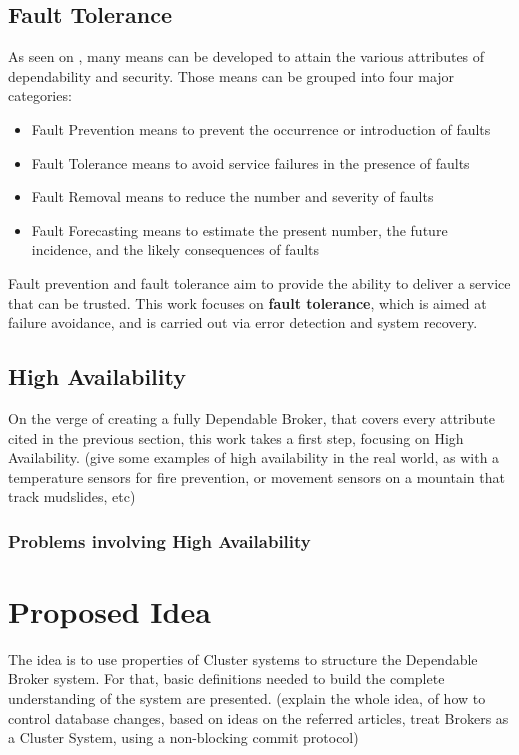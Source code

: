 \subsection{Fault Tolerance}
As seen on \cite{avivzienis2004basic}, many means can be developed to attain the various attributes of
dependability and security. Those means can be grouped into four major categories:
\begin{itemize}
	\item{Fault Prevention} means to prevent the occurrence or introduction of faults
	\item{Fault Tolerance} means to avoid service failures in the presence of faults
	\item{Fault Removal} means to reduce the number and severity of faults
	\item{Fault Forecasting} means to estimate the present number, the future incidence, and the likely consequences of faults
\end{itemize}

Fault prevention and fault tolerance aim to provide the ability to deliver a service that can be trusted. This work focuses on \textbf{fault tolerance}, which is aimed at failure avoidance, and is carried out via error detection and system recovery.



\subsection{High Availability}
On the verge of creating a fully Dependable Broker, that covers every attribute cited in the previous section, this work takes a first step, focusing on High Availability.
(give some examples of high availability in the real world, as with a temperature sensors for fire prevention, or movement sensors on a mountain that track mudslides, etc)



\subsubsection{Problems involving High Availability}

\section{Proposed Idea}
The idea is to use properties of Cluster systems to structure the Dependable Broker system. For that, basic definitions needed to build the complete understanding of the system are presented.
(explain the whole idea, of how to control database changes, based on ideas on the referred articles, treat Brokers as a Cluster System, using a non-blocking commit protocol)
\cite{arsanjani2004service} \cite{barreradesign}  \cite{skeen1981nonblocking} 

